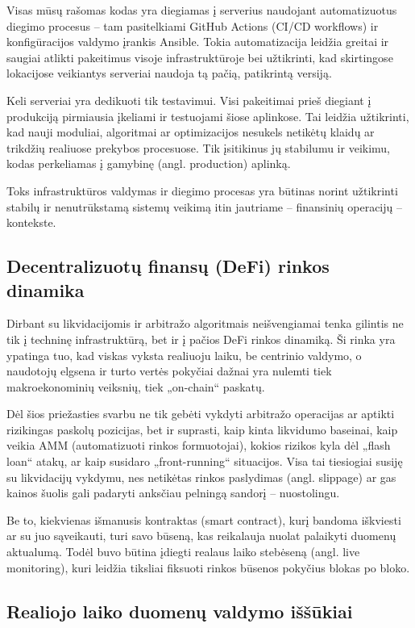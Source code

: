 \documentclass[]{VUMIFTemplateClass}
\begin{document}
Visas mūsų rašomas kodas yra diegiamas į serverius naudojant automatizuotus diegimo procesus – tam pasitelkiami GitHub Actions (CI/CD workflows) ir konfigūracijos valdymo įrankis Ansible. Tokia automatizacija leidžia greitai ir saugiai atlikti pakeitimus visoje infrastruktūroje bei užtikrinti, kad skirtingose lokacijose veikiantys serveriai naudoja tą pačią, patikrintą versiją.

Keli serveriai yra dedikuoti tik testavimui. Visi pakeitimai prieš diegiant į produkciją pirmiausia įkeliami ir testuojami šiose aplinkose. Tai leidžia užtikrinti, kad nauji moduliai, algoritmai ar optimizacijos nesukels netikėtų klaidų ar trikdžių realiuose prekybos procesuose. Tik įsitikinus jų stabilumu ir veikimu, kodas perkeliamas į gamybinę (angl. production) aplinką.

Toks infrastruktūros valdymas ir diegimo procesas yra būtinas norint užtikrinti stabilų ir nenutrūkstamą sistemų veikimą itin jautriame – finansinių operacijų – kontekste.

\subsection{Decentralizuotų finansų (DeFi) rinkos dinamika}

Dirbant su likvidacijomis ir arbitražo algoritmais neišvengiamai tenka gilintis ne tik į techninę infrastruktūrą, bet ir į pačios DeFi rinkos dinamiką. Ši rinka yra ypatinga tuo, kad viskas vyksta realiuoju laiku, be centrinio valdymo, o naudotojų elgsena ir turto vertės pokyčiai dažnai yra nulemti tiek makroekonominių veiksnių, tiek „on-chain“ paskatų.

Dėl šios priežasties svarbu ne tik gebėti vykdyti arbitražo operacijas ar aptikti rizikingas paskolų pozicijas, bet ir suprasti, kaip kinta likvidumo baseinai, kaip veikia AMM (automatizuoti rinkos formuotojai), kokios rizikos kyla dėl „flash loan“ atakų, ar kaip susidaro „front-running“ situacijos. Visa tai tiesiogiai susiję su likvidacijų vykdymu, nes netikėtas rinkos paslydimas (angl. slippage) ar gas kainos šuolis gali padaryti anksčiau pelningą sandorį – nuostolingu.

Be to, kiekvienas išmanusis kontraktas (smart contract), kurį bandoma iškviesti ar su juo sąveikauti, turi savo būseną, kas reikalauja nuolat palaikyti duomenų aktualumą. Todėl buvo būtina įdiegti realaus laiko stebėseną (angl. live monitoring), kuri leidžia tiksliai fiksuoti rinkos būsenos pokyčius blokas po bloko.

\subsection{Realiojo laiko duomenų valdymo iššūkiai}
\end{document}
